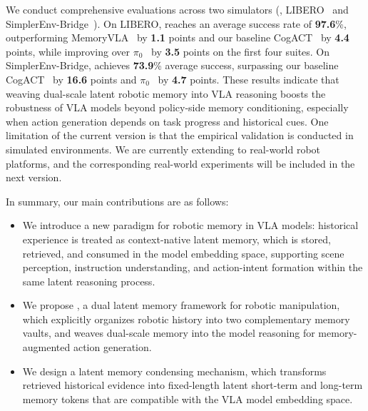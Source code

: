 We conduct comprehensive evaluations across two simulators (\ie, LIBERO~\cite{liu2023libero} and SimplerEnv-Bridge~\cite{li2025evaluating}).
On LIBERO, \ourmethod reaches an average success rate of \textbf{97.6}\%, outperforming MemoryVLA~\cite{shi2025memoryvla} by \textbf{1.1} points and our baseline CogACT~\cite{li2024cogact} by \textbf{4.4} points, while improving over \(\pi_0\)~\cite{black2024pi_0} by \textbf{3.5} points on the first four suites.
On SimplerEnv-Bridge, \ourmethod achieves \textbf{73.9}\% average success, surpassing our baseline CogACT~\cite{li2024cogact} by \textbf{16.6} points and \(\pi_0\)~\cite{black2024pi_0} by \textbf{4.7} points.
These results indicate that weaving dual-scale latent robotic memory into VLA reasoning boosts the robustness of VLA models beyond policy-side memory conditioning, especially when action generation depends on task progress and historical cues.
One limitation of the current version is that the empirical validation is conducted in simulated environments. We are currently extending \ourmethod to real-world robot platforms, and the corresponding real-world experiments will be included in the next version.

In summary, our main contributions are as follows:
\begin{itemize}[leftmargin=*]
\item We introduce a new paradigm for robotic memory in VLA models: historical experience is treated as context-native latent memory, which is stored, retrieved, and consumed in the model embedding space, supporting scene perception, instruction understanding, and action-intent formation within the same latent reasoning process.
    \item We propose \ourmethod, a dual latent memory framework for robotic manipulation, which explicitly organizes robotic history into two complementary memory vaults, and weaves dual-scale memory into the model reasoning for memory-augmented action generation.
    \item We design a latent memory condensing mechanism, which transforms retrieved historical evidence into fixed-length latent short-term and long-term memory tokens that are compatible with the VLA model embedding space.
\end{itemize}

